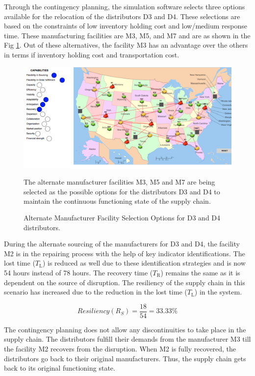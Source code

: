 Through the contingency planning, the simulation software selects three options available for the relocation of the distributors D3 and D4. These selections are based on the constraints of low inventory holding cost and  low/medium response time. These manufacturing facilities are M3, M5, and M7 and are as shown in the Fig \ref{ALTM}. Out of these alternatives, the facility M3 has an advantage over the others in terms if inventory holding cost and transportation cost. 

\begin{figure}[H]
  \centering
  \includegraphics[width=6.5in]{figures/pdf/ALTM.png}\\
  \caption{Alternate Manufacturer Facility Selection Options for D3 and D4 distributors.}
  {The alternate manufacturer facilities M3, M5 and M7 are being selected as the possible options for the distributors D3 and D4 to maintain the continuous functioning state of the supply chain.}
  \label{ALTM}
\end{figure}    

During the alternate sourcing of the manufacturers for D3 and D4, the facility M2 is in the repairing process with the help of key indicator identifications. The lost time ($T_{\text{L}}$) is reduced as well due to these identification strategies and is now 54 hours instead of 78 hours. The recovery time ($T_{\text{R}}$) remains the same as it is dependent on the source of disruption. The resiliency of the supply chain in this scenario has increased due to the reduction in the lost time ($T_{\text{L}}$) in the system. 

\begin{equation}
    Resiliency(R_S) = \frac{18}{54} = 33.33 \% \label{3.18}
\end{equation}

The contingency planning does not allow any discontinuities to take place in the supply chain. The distributors fulfill their demands from the manufacturer M3 till the facility M2 recovers from the disruption. When M2 is fully recovered, the distributors go back to their original manufacturers. Thus, the supply chain gets back to its original functioning state. 

